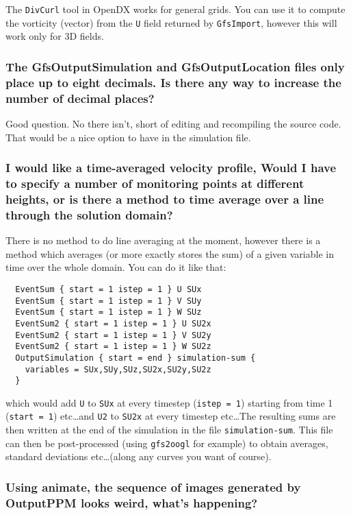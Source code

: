 \documentclass[a4paper]{article}
\begin{document}
The {\tt DivCurl} tool in OpenDX works for general grids. You can use it
to compute the vorticity (vector) from the {\tt U} field returned by
{\tt GfsImport}, however this will work only for 3D fields.

\subsubsection{The GfsOutputSimulation and GfsOutputLocation files only place up
to eight decimals. Is there any way to increase the number of decimal places?}

Good question. No there isn't, short of editing and recompiling the
source code. That would be a nice option to have in the simulation
file.

\subsubsection{I would like a time-averaged velocity profile,
Would I have to specify a number of monitoring points at different heights,  
or is there a method to time average over a line through the solution 
domain?}

There is no method to do line averaging at the moment, however there
is a method which averages (or more exactly stores the sum) of a given
variable in time over the whole domain. You can do it like that:
\begin{verbatim} 
  EventSum { start = 1 istep = 1 } U SUx
  EventSum { start = 1 istep = 1 } V SUy
  EventSum { start = 1 istep = 1 } W SUz
  EventSum2 { start = 1 istep = 1 } U SU2x
  EventSum2 { start = 1 istep = 1 } V SU2y
  EventSum2 { start = 1 istep = 1 } W SU2z
  OutputSimulation { start = end } simulation-sum { 
    variables = SUx,SUy,SUz,SU2x,SU2y,SU2z
  }
\end{verbatim}
which would add {\tt U} to {\tt SUx} at every timestep ({\tt istep = 1}) starting from
time 1 ({\tt start = 1}) etc\dots and {\tt U2} to {\tt SU2x} at every timestep
etc\dots The resulting sums are then written at the end of the
simulation in the file {\tt simulation-sum}. This file can then be
post-processed (using {\tt gfs2oogl} for example) to obtain averages,
standard deviations etc\dots (along any curves you want of course).

\subsubsection{Using animate, the sequence of images generated by OutputPPM looks weird, what's happening?}
\end{document}
